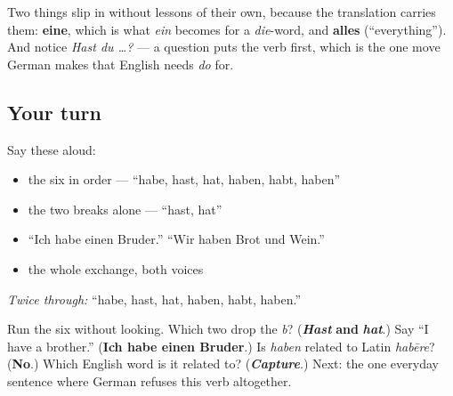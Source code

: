 Two things slip in without lessons of their own, because the translation carries them: \textbf{eine}, which is what \emph{ein} becomes for a \emph{die}-word, and \textbf{alles} (\textquotedblleft{}everything\textquotedblright{}). And notice \emph{Hast du …?} — a question puts the verb first, which is the one move German makes that English needs \emph{do} for.

\subsection*{Your turn}
Say these aloud:

\begin{itemize}
\raggedright
  \item the six in order — \textquotedblleft{}habe, hast, hat, haben, habt, haben\textquotedblright{}
  \item the two breaks alone — \textquotedblleft{}hast, hat\textquotedblright{}
  \item \textquotedblleft{}Ich habe einen Bruder.\textquotedblright{} \textquotedblleft{}Wir haben Brot und Wein.\textquotedblright{}
  \item the whole exchange, both voices
\end{itemize}

\emph{Twice through:} \textquotedblleft{}habe, hast, hat, haben, habt, haben.\textquotedblright{}

\begin{tcolorbox}[breakable,colback=teal!4,colframe=teal!35!black,title={Before you move on}]
Run the six without looking. Which two drop the \emph{b}? (\emph{\textbf{Hast}} \textbf{and} \emph{\textbf{hat}}.) Say \textquotedblleft{}I have a brother.\textquotedblright{} (\textbf{Ich habe einen Bruder}.) Is \emph{haben} related to Latin \emph{habēre}? (\textbf{No}.) Which English word is it related to? (\emph{\textbf{Capture}}.) Next: the one everyday sentence where German refuses this verb altogether.
\end{tcolorbox}
